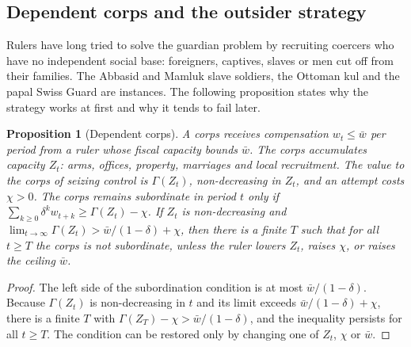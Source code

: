 \documentclass[11pt,letterpaper]{article}
\newtheorem{proposition}[theorem]{Proposition}
\theoremstyle{definition}
\theoremstyle{remark}
\begin{document}
\subsection{Dependent corps and the outsider strategy}

Rulers have long tried to solve the guardian problem by recruiting coercers who have no independent social base: foreigners, captives, slaves or men cut off from their families. The Abbasid and Mamluk slave soldiers, the Ottoman kul and the papal Swiss Guard are instances. The following proposition states why the strategy works at first and why it tends to fail later.

\begin{proposition}[Dependent corps]
\label{prop:coercive-power:outsider}
A corps receives compensation $w_t \le \bar{w}$ per period from a ruler whose fiscal capacity bounds $\bar{w}$. The corps accumulates capacity $Z_t$: arms, offices, property, marriages and local recruitment. The value to the corps of seizing control is $\Gamma(Z_t)$, non-decreasing in $Z_t$, and an attempt costs $\chi > 0$. The corps remains subordinate in period $t$ only if $\sum_{k \ge 0}\delta^k w_{t+k} \ge \Gamma(Z_t) - \chi$. If $Z_t$ is non-decreasing and $\lim_{t\to\infty}\Gamma(Z_t) > \bar{w}/(1-\delta) + \chi$, then there is a finite $T$ such that for all $t \ge T$ the corps is not subordinate, unless the ruler lowers $Z_t$, raises $\chi$, or raises the ceiling $\bar{w}$.
\end{proposition}

\begin{proof}
The left side of the subordination condition is at most $\bar{w}/(1-\delta)$. Because $\Gamma(Z_t)$ is non-decreasing in $t$ and its limit exceeds $\bar{w}/(1-\delta) + \chi$, there is a finite $T$ with $\Gamma(Z_T) - \chi > \bar{w}/(1-\delta)$, and the inequality persists for all $t \ge T$. The condition can be restored only by changing one of $Z_t$, $\chi$ or $\bar{w}$.
\end{proof}
\end{document}
